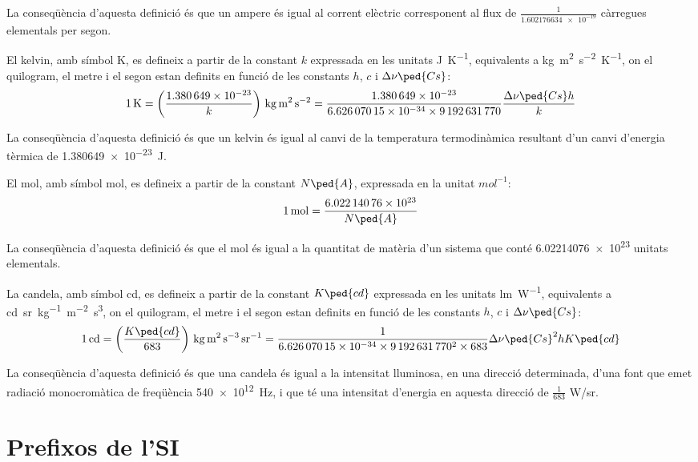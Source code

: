 \begin{list}{}
    La conseqüència d'aquesta definició és que un ampere és igual al corrent elèctric corresponent al flux de $\frac{1}{\num{1,602176634e-19}}$   càrregues elementals per segon.

   \item[\textbf{kelvin}]  El kelvin, amb símbol K, es defineix a partir de la constant $k$ expressada en les unitats \unit{J.K^{-1}},  equivalents a \unit{kg.m^2.s^{-2}.K^{-1}},  on el quilogram, el metre i el segon estan definits en funció de les constants $h$, $c$ i $\Delta\nu\ped{Cs}$:
       \[
            \qty{1}{K} = \left(\frac{\num{1,380649e-23}}{k}\right)\unit{\,kg.m^2.s^{-2}} = \frac{\num{1,380649e-23}}{\num{6,62607015 e-34}\times\num{9192631770}} \frac{\Delta\nu\ped{Cs} h}{k}
       \]

    La conseqüència d'aquesta definició és que un kelvin és igual al canvi de la temperatura termodinàmica resultant d'un canvi d'energia tèrmica de \qty{1,380649e-23}{J}.

   \item[\textbf{mol}]  El mol, amb símbol mol, es defineix a partir de la constant $N\ped{A}$, expressada en la unitat  $\unit{mol^{-1}}$:
       \[
            \qty{1}{mol} = \frac{\num{6,02214076 e23}}{N\ped{A}}
       \]

    La conseqüència d'aquesta definició és que el mol és igual a la quantitat de matèria d'un sistema que conté
    \num{6,02214076 e23} unitats elementals.

   \item[\textbf{candela}] La candela, amb símbol cd, es defineix a partir de la constant $K\ped{cd}$ expressada en les unitats \unit{lm.W^{-1}},  equivalents a \unit{cd.sr.kg^{-1}.m^{-2}.s^3},  on el quilogram, el metre i el segon estan definits en funció de les constants $h$, $c$ i $\Delta\nu\ped{Cs}$:
       \[
            \qty{1}{cd} = \left(\frac{K\ped{cd}}{683}\right)\unit{\,kg.m^2.s^{-3}.sr^{-1}} = \frac{1}{\num{6,62607015 e-34}\times\num{9192631770}^2\times 683} \Delta\nu\ped{Cs}^2 h K\ped{cd}
       \]

    La conseqüència d'aquesta definició és que una candela és igual a la intensitat lluminosa, en una direcció determinada,   d'una font que emet radiació monocromàtica de freqüència \qty{540e12}{Hz}, i
   que té una intensitat d'energia en aquesta direcció de $\frac{1}{683}$ \unit{W/sr}.
\end{list}


\section{Prefixos de l'SI}

